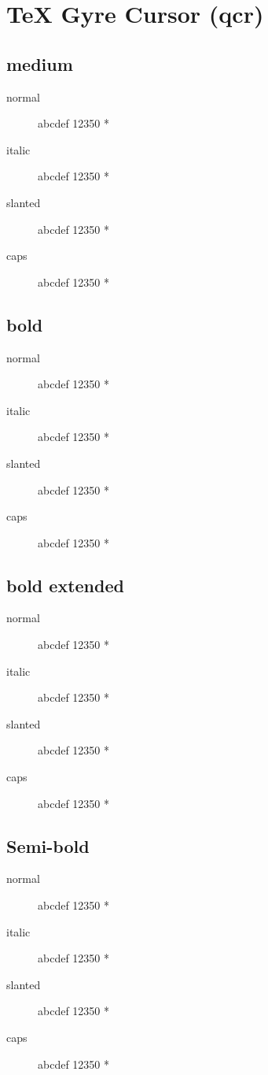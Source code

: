 \section{\TeX{} Gyre Cursor (qcr)}

\subsection{medium}
\begin{description}
    \item [normal]  abcdef 12350 *
    \item [italic]  abcdef 12350 *
    \item [slanted]  abcdef 12350 *
    \item [caps]  abcdef 12350 *
\end{description}
    
\subsection{bold}
\begin{description}
    \item [normal]  abcdef 12350 *
    \item [italic]  abcdef 12350 *
    \item [slanted]  abcdef 12350 *
    \item [caps]  abcdef 12350 *
\end{description}
    
\subsection{bold extended}
\begin{description}
    \item [normal]  abcdef 12350 *
    \item [italic]  abcdef 12350 *
    \item [slanted]  abcdef 12350 *
    \item [caps]  abcdef 12350 *
\end{description}

\subsection{Semi-bold}
\begin{description}
    \item [normal]  abcdef 12350 *
    \item [italic]  abcdef 12350 *
    \item [slanted]  abcdef 12350 *
    \item [caps]  abcdef 12350 *
\end{description}


